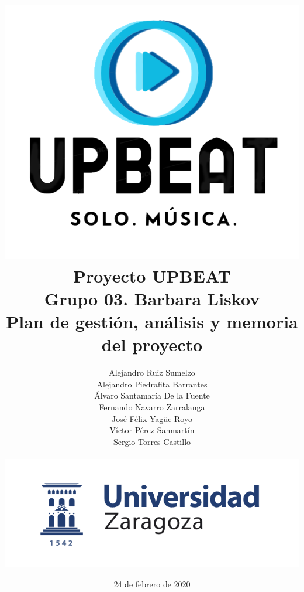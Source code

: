 \documentclass{article}
\begin{document}
\title{\includegraphics[scale=0.65]{logoDefinitivo1.png} \\ \textbf{Proyecto UPBEAT} \\ \textbf{Grupo 03. Barbara Liskov}\\Plan de gestión, análisis y memoria del proyecto \vspace{0.1cm} \\}


\author{Alejandro Ruiz Sumelzo\\
Alejandro Piedrafita Barrantes\\
Álvaro Santamaría De la Fuente\\
Fernando Navarro Zarralanga\\
José Félix Yagüe Royo\\
Víctor Pérez Sanmartín\\
Sergio Torres Castillo \vspace{0.25cm}
\\\\
\includegraphics[scale=0.5]{logoUZ.png}\\
}
\date{24 de febrero de 2020}
\end{document}
